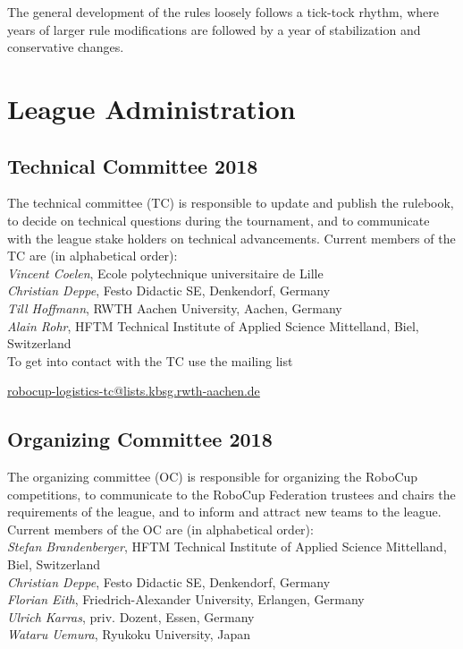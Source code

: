 \documentclass[12pt,twoside]{article}
\begin{document}
The general development of the rules loosely follows a tick-tock
rhythm, where years of larger rule modifications are followed by a
year of stabilization and conservative changes.


\section{League Administration} \label{sec:commitees}
\subsection{Technical Committee 2018}
\label{sec:tc}
The technical committee (TC) is responsible to update and publish the
rulebook, to decide on technical questions during the tournament, and
to communicate with the league stake holders on technical
advancements. Current members of the TC are (in alphabetical order):\\[.5em]
\emph{Vincent Coelen}, Ecole polytechnique universitaire de Lille\\
\emph{Christian Deppe}, Festo Didactic SE, Denkendorf, Germany\\
\emph{Till Hoffmann}, RWTH Aachen University, Aachen, Germany\\
\emph{Alain Rohr}, HFTM Technical Institute of Applied Science Mittelland,
Biel, Switzerland\\
To get into contact with the TC use the mailing list\\
\centerline{\url{robocup-logistics-tc@lists.kbsg.rwth-aachen.de}}

\subsection{Organizing Committee 2018}
\label{sec:oc}
The organizing committee (OC) is responsible for organizing the
RoboCup competitions, to communicate to the RoboCup Federation
trustees and chairs the requirements of the league, and to inform and
attract new teams to the league. Current members of the OC are (in
alphabetical order):\\[.5em]
\emph{Stefan Brandenberger}, HFTM Technical Institute of Applied Science
Mittelland, Biel, Switzerland\\
\emph{Christian Deppe}, Festo Didactic SE, Denkendorf, Germany\\
\emph{Florian Eith}, Friedrich-Alexander University, Erlangen, Germany\\
\emph{Ulrich Karras}, priv. Dozent, Essen, Germany\\
\emph{Wataru Uemura}, Ryukoku University, Japan\\
\end{document}
